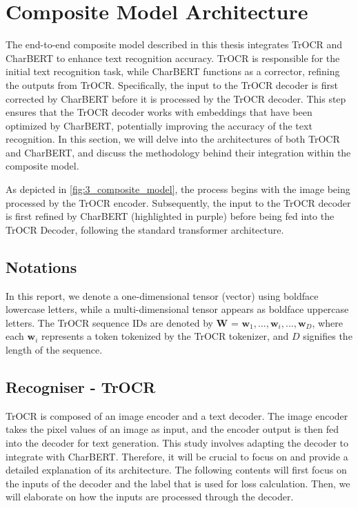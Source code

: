\section{Composite Model Architecture}
\label{sec:3_composite_model_architecture}
The end-to-end composite model described in this thesis integrates TrOCR and CharBERT to enhance text recognition accuracy. TrOCR is responsible for the initial text recognition task, while CharBERT functions as a corrector, refining the outputs from TrOCR. Specifically, the input to the TrOCR decoder is first corrected by CharBERT before it is processed by the TrOCR decoder. This step ensures that the TrOCR decoder works with embeddings that have been optimized by CharBERT, potentially improving the accuracy of the text recognition. In this section, we will delve into the architectures of both TrOCR and CharBERT, and discuss the methodology behind their integration within the composite model.

As depicted in \autoref{fig:3_composite_model}, the process begins with the image being processed by the TrOCR encoder. Subsequently, the input to the TrOCR decoder is first refined by CharBERT (highlighted in purple) before being fed into the TrOCR Decoder, following the standard transformer architecture.


\subsection{Notations}
\label{subsec:3_Notations}
In this report, we denote a one-dimensional tensor (vector) using boldface lowercase letters, while a multi-dimensional tensor appears as boldface uppercase letters. The TrOCR sequence IDs are denoted by $\mathbf{W}$ = {$\mathbf{w}_1, ..., \mathbf{w}_i, ..., \mathbf{w}_D$}, where each $\mathbf{w}_i$ represents a token tokenized by the TrOCR tokenizer, and $D$ signifies the length of the sequence.

\subsection{Recogniser - TrOCR}
\label{subsec:3_recogniser_trocr}
TrOCR is composed of an image encoder and a text decoder. The image encoder takes the pixel values of an image as input, and the encoder output is then fed into the decoder for text generation. This study involves adapting the decoder to integrate with CharBERT. Therefore, it will be crucial to focus on and provide a detailed explanation of its architecture. The following contents will first focus on the inputs of the decoder and the label that is used for loss calculation. Then, we will elaborate on how the inputs are processed through the decoder.

